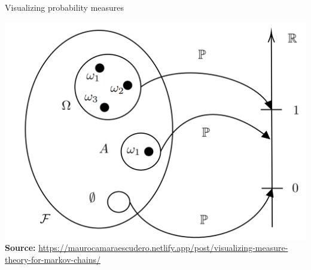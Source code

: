 \documentclass[a4,11pt]{beamer}
\begin{document}
\begin{frame}{Visualizing probability measures}
   \begin{center}
       \includegraphics[width=.8\linewidth]{graphics/ProbabilityMeasure.png}\\
       {\tiny \textbf{Source:} \url{https://maurocamaraescudero.netlify.app/post/visualizing-measure-theory-for-markov-chains/}}
   \end{center} 
\end{frame}
\end{document}

